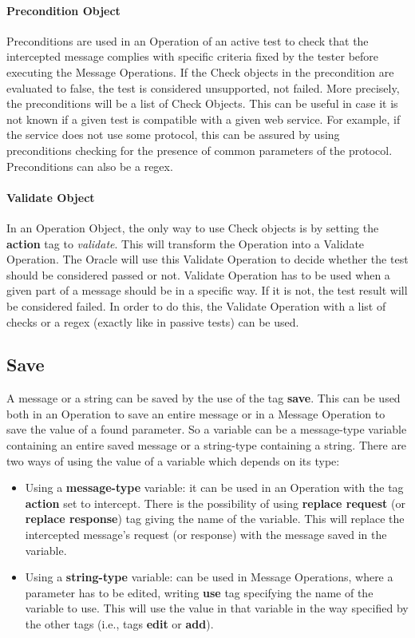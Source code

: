 \paragraph{Precondition Object}
Preconditions are used in an Operation of an active test to check that the intercepted message complies with specific criteria fixed by the tester before executing the Message Operations. If the Check objects in the precondition are evaluated to false, the test is considered unsupported, not failed. More precisely, the preconditions will be a list of Check Objects. This can be useful in case it is not known if a given test is compatible with a given web service. For example, if the service does not use some protocol, this can be assured by using preconditions checking for the presence of common parameters of the protocol. Preconditions can also be a regex.
\paragraph{Validate Object}
In an Operation Object, the only way to use Check objects is by setting the \textbf{action} tag to \textit{validate}. This will transform the Operation into a Validate Operation. The Oracle will use this Validate Operation to decide whether the test should be considered passed or not. Validate Operation has to be used when a given part of a message should be in a specific way. If it is not, the test result will be considered failed.
In order to do this, the Validate Operation with a list of checks or a regex (exactly like in passive tests) can be used.

\subsection{Save}
A message or a string can be saved by the use of the tag \textbf{save}. This can be used both in an Operation to save an entire message or in a Message Operation to save the value of a found parameter. So a variable can be a message-type variable containing an entire saved message or a string-type containing a string.
There are two ways of using the value of a variable which depends on its type:
\begin{itemize}
    \item Using a \textbf{message-type} variable: it can be used in an Operation with the tag \textbf{action} set to intercept. There is the possibility of using \textbf{replace request} (or \textbf{replace response}) tag giving the name of the variable. This will replace the intercepted message's request (or response) with the message saved in the variable.
    \item Using a \textbf{string-type} variable: can be used in Message Operations, where a parameter has to be edited, writing \textbf{use} tag specifying the name of the variable to use. This will use the value in that variable in the way specified by the other tags (i.e., tags \textbf{edit} or \textbf{add}).
\end{itemize}

